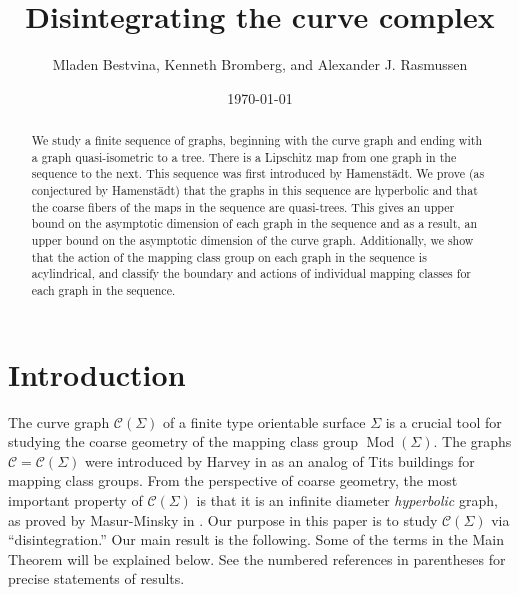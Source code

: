 \documentclass[11pt]{article}
\date \today
\title{Disintegrating the curve complex}
\author{Mladen Bestvina, Kenneth Bromberg, and Alexander J. Rasmussen}
\theoremstyle{remark}
\def\C{{\mathcal C}}
\def\Mod{\operatorname{Mod}}
\begin{document}
\maketitle

\begin{abstract}
We study a finite sequence of graphs, beginning with the curve graph and ending
with a graph quasi-isometric to a tree. There is a Lipschitz map from one
graph in the sequence to the next. This sequence was first introduced by
Hamenst\"{a}dt. We prove (as conjectured by Hamenst\"{a}dt) that the graphs in this
sequence are hyperbolic and that the coarse fibers of the maps in the sequence
are quasi-trees. This gives an upper bound on the asymptotic dimension of each
graph in the sequence and as a result, an upper bound on the asymptotic dimension
of the curve graph. Additionally, we show that the action of the mapping class
group on each graph in the sequence is acylindrical, and classify the boundary
and actions of individual mapping classes for each graph in the sequence.
\end{abstract}

\section{Introduction}


The curve graph $\C(\Sigma)$ of a finite type orientable surface $\Sigma$
is a crucial tool for studying the coarse geometry of the mapping class group
$\Mod(\Sigma)$. The graphs $\C=\C(\Sigma)$ were introduced by Harvey in \cite{Harvey}
as an analog of Tits buildings for mapping class groups. From the perspective
of coarse geometry, the most important property of $\C(\Sigma)$ is that it is
an infinite diameter \emph{hyperbolic} graph, as proved by Masur-Minsky in \cite{MM}.
Our purpose in this paper is to study $\C(\Sigma)$ via
``disintegration.'' Our main result is the following. Some of the terms in the Main
Theorem will be explained below.
See the numbered references in parentheses for precise statements of results.
\end{document}
